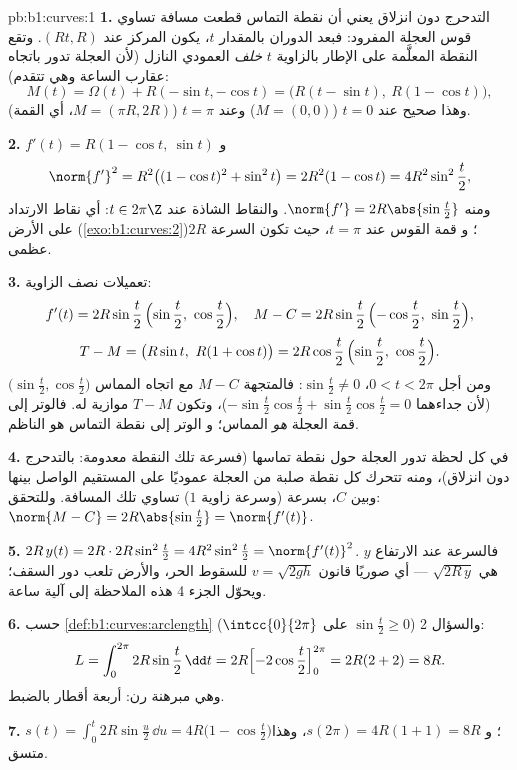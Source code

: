 \begin{solution}{pb:b1:curves:1}
\textbf{1.} التدحرج دون انزلاق يعني أن نقطة التماس
قطعت مسافة تساوي قوس العجلة المفرود: فبعد
الدوران بالمقدار $t$، يكون المركز عند $(Rt, R)$. وتقع النقطة المعلَّمة
على الإطار بالزاوية $t$ \emph{خلف} العمودي النازل
(لأن العجلة تدور باتجاه عقارب الساعة وهي تتقدم):
\[
M(t) = \Omega(t) + R(-\sin t, -\cos t)
= \bigl(R(t - \sin t),\ R(1 - \cos t)\bigr),
\]
وهذا صحيح عند $t = 0$ ($M = (0,0)$) وعند $t = \pi$ ($M =
(\pi R, 2R)$، أي القمة).

\textbf{2.} $f'(t) = R(1 - \cos t,\ \sin t)$ و
\[
\norm{f'}^2 = R^2\bigl((1-\cos t)^2 + \sin^2 t\bigr)
= 2R^2(1 - \cos t) = 4R^2\sin^2\frac t2 ,
\]
ومنه $\norm{f'} = 2R\abs{\sin\frac t2}$. والنقاط الشاذة عند $t \in
2\pi\Z$: أي نقاط الارتداد على الأرض (\cref{exo:b1:curves:2})؛ و
قمة القوس عند $t = \pi$، حيث تكون السرعة $2R$ عظمى.

\textbf{3.} تعميلات نصف الزاوية:
\[
f'(t) = 2R\sin\frac t2\,\Bigl(\sin\frac t2,\ \cos\frac t2\Bigr),
\quad
M - C = 2R\sin\frac t2\,\Bigl(-\cos\frac t2,\ \sin\frac t2\Bigr),
\]
\[
T - M = \bigl(R\sin t,\ R(1 + \cos t)\bigr)
= 2R\cos\frac t2\,\Bigl(\sin\frac t2,\ \cos\frac t2\Bigr).
\]
ومن أجل $0 < t < 2\pi$، $\sin\frac t2 \neq 0$: فالمتجهة $M - C$ 
مع اتجاه المماس $\bigl(\sin\frac t2, \cos\frac
t2\bigr)$ (لأن جداءهما $-\sin\frac t2\cos\frac t2 +
\sin\frac t2\cos\frac t2 = 0$)، وتكون $T - M$ موازية له.
فالوتر إلى قمة العجلة \emph{هو} المماس؛ و
الوتر إلى نقطة التماس هو الناظم.

\textbf{4.} في كل لحظة تدور العجلة حول نقطة تماسها
(فسرعة تلك النقطة معدومة: بالتدحرج دون انزلاق)،
ومنه تتحرك كل نقطة صلبة من العجلة عموديًا على المستقيم
الواصل بينها وبين $C$، بسرعة (وسرعة زاوية $1$) تساوي
تلك المسافة. وللتحقق: $\norm{M - C} = 2R\abs{\sin\frac t2} =
\norm{f'(t)}$.

\textbf{5.} $2R\,y(t) = 2R\cdot 2R\sin^2\frac t2 =
4R^2\sin^2\frac t2 = \norm{f'(t)}^2$. فالسرعة عند الارتفاع $y$ هي
$\sqrt{2R\,y}$ --- أي صوريًا قانون $v = \sqrt{2gh}$ للسقوط
الحر، والأرض تلعب دور السقف؛ ويحوّل الجزء 4 هذه
الملاحظة إلى آلية ساعة.

\textbf{6.} حسب \cref{def:b1:curves:arclength} والسؤال 2
($\sin\frac t2 \geq 0$ على $\intcc{0}{2\pi}$):
\[
L = \int_0^{2\pi} 2R\sin\frac t2\,\dd t
= 2R\Bigl[-2\cos\frac t2\Bigr]_0^{2\pi} = 2R(2 + 2) = 8R .
\]
وهي مبرهنة رن: أربعة أقطار بالضبط.

\textbf{7.} $s(t) = \int_0^t 2R\sin\frac u2\,\dd u =
4R\bigl(1 - \cos\frac t2\bigr)$؛ و $s(2\pi) = 4R(1+1) = 8R$،
وهذا متسق.


\end{solution}
